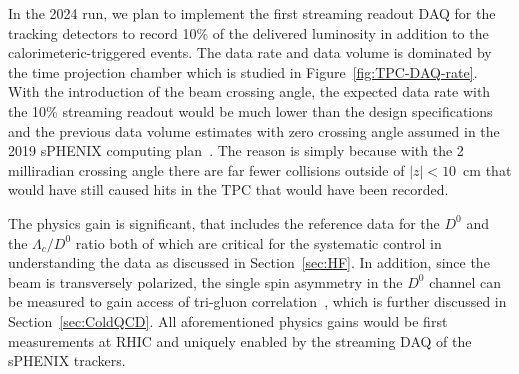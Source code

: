 In the 2024 run, we plan to implement the first streaming readout DAQ for the tracking detectors to record 10\% of the delivered luminosity in addition to the calorimeteric-triggered events. The data rate and data volume is dominated by the time projection chamber which is studied in Figure~\ref{fig:TPC-DAQ-rate}. With the introduction of the beam crossing angle, the expected data rate with the 10\% streaming readout would be much lower than the design specifications and the previous data volume estimates with zero crossing angle assumed in the 2019 sPHENIX computing plan~\cite{sPH-COMP-2019-001}. The reason is simply because with the 2 milliradian crossing angle there are far fewer collisions outside of $|z|<10$~cm that would have still caused hits in the TPC that would have been recorded.

The physics gain is significant, that includes the \pp reference data for the $D^0$ \raa and the $\Lambda_c/D^0$ ratio both of which are critical for the systematic control in understanding the \AuAu data as discussed in Section~\ref{sec:HF}. In addition, since the \pp beam is transversely polarized, the single spin asymmetry in the $D^0$ channel can be measured to gain access of tri-gluon correlation~\cite{Kang:2008ih, Koike:2011mb}, which is further discussed in Section~\ref{sec:ColdQCD}. 
All aforementioned physics gains would be first measurements at RHIC and uniquely enabled by the streaming DAQ of the sPHENIX trackers.


 

